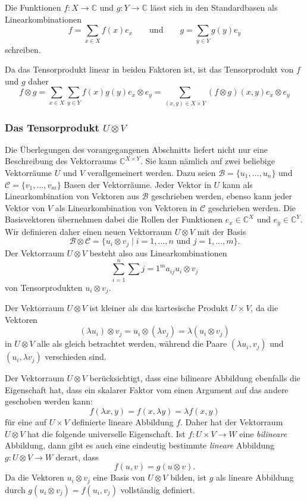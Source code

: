 Die Funktionen $f\colon X\to \mathbb{C}$ und $g\colon Y\to\mathbb{C}$
lässt sich in den Standardbasen als Linearkombinationen
\[
f = \sum_{x\in X} f(x)e_x
\qquad\text{und}\qquad
g = \sum_{y\in Y} g(y)e_y
\]
schreiben.

Da das Tensorprodukt linear in beiden Faktoren ist, ist das Tensorprodukt
von $f$ und $g$ daher
\[
f\otimes g
=
\sum_{x\in X}\sum_{y\in Y}
f(x)g(y) e_x\otimes e_y
=
\sum_{(x,y)\in X\times Y}
(f\otimes g)(x,y) e_x\otimes e_y
\]

%
%
\subsubsection{Das Tensorprodukt $U\otimes V$}
Die Überlegungen des vorangegangenen Abschnitts liefert nicht nur
eine Beschreibung des Vektorraums $\mathbb{C}^{X\times Y}$.
Sie kann nämlich auf zwei beliebige Vektorräume
$U$ und $V$ verallgemeinert werden.
Dazu seien $\mathcal{B}=\{u_1,\dots,u_n\}$ und $\mathcal{C}=\{v_1,\dots,v_m\}$
Basen der Vektorräume.
Jeder Vektor in $U$ kann als Linearkombination von Vektoren aus
$\mathcal{B}$ geschrieben werden, ebenso kann jeder Vektor von $V$
als Linearkombination von Vektoren in $\mathcal{C}$ geschrieben werden.
Die Basisvektoren übernehmen dabei die Rollen der Funktionen
$e_x\in \mathbb{C}^X$ und $e_y\in\mathbb{C}^Y$.
Wir definieren daher einen neuen Vektorraum $U\otimes V$ mit
der Basis
\[
\mathcal{B}\otimes\mathcal{C}
=
\{
u_i\otimes v_j
\mid
i=1,\dots,n\text{ und }j=1,\dots,m
\}.
\]
Der Vektorraum $U\otimes V$ besteht also aus Linearkombinationen
\[
\sum_{i=1}^n \sum{j=1}^m
a_{ij} u_i\otimes v_j
\]
von Tensorprodukten $u_i\otimes v_j$.

Der Vektorraum $U\otimes V$ ist kleiner als das kartesische Produkt
$U\times V$, da die Vektoren
\[
(\lambda u_i)\otimes v_j
=
u_i\otimes (\lambda v_j)
=
\lambda (u_i\otimes v_j)
\]
in $U\otimes V$ alle als gleich betrachtet werden, während die
Paare $(\lambda u_i,v_j)$ und $(u_i,\lambda v_j)$ verschieden sind.

Der Vektorraum $U\otimes V$ berücksichtigt, dass eine bilineare Abbildung
ebenfalls die Eigenschaft hat, dass ein skalarer Faktor vom einen
Argument auf das andere geschoben werden kann:
\[
f(\lambda x,y) = f(x,\lambda y) = \lambda f(x,y)
\]
für eine auf $U\times V$ definierte lineare Abbildung $f$.
Daher hat der Vektorraum $U\otimes V$ hat die folgende universelle
Eigenschaft.
Ist $f\colon U\times V\to W$ eine {\em bilineare} Abbildung, dann
gibt es auch eine eindeutig bestimmte {\em lineare} Abbildung
$g\colon U\otimes V\to W$ derart, dass
\[
f(u,v)
=
g(u\otimes v).
\]
Da die Vektoren $u_i\otimes v_j$ eine Basis von $U\otimes V$ bilden,
ist $g$ als lineare Abbildung durch $g(u_i\otimes v_j) = f(u_i,v_j)$
vollständig definiert.

